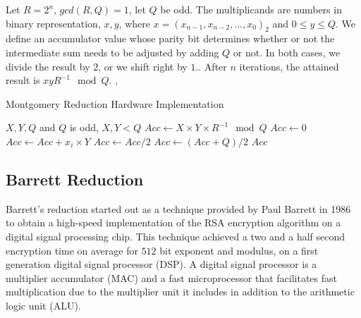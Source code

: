 \documentclass[11pt,
  titlepage=false,
  abstract=on,
]{scrreprt}
\begin{document}
Let $R=2^n$, $gcd(R, Q)=1$, let $Q$ be odd. The multiplicands are numbers in binary representation, $x, y$, where $x = (x_{n-1}, x_{n-2},...,x_{0})_2$ and $0 \leq y \leq Q$. 
We define an accumulator value whose parity bit determines whether or not the intermediate sum needs to be adjusted by adding $Q$ or not. In both cases, we divide the result by
$2$, or we shift right by $1.$. After $n$ iterations, the attained result is $xyR^{-1} \mod Q$. \cite{montgomery1985modular}, \cite{7219961}

\begin{algorithm}
  \caption{Montgomery Reduction Hardware Implementation}
  \label{alg:montgomery}
  \begin{algorithmic}[1]
  \REQUIRE \( X, Y, Q \) and \( Q \) is odd, \( X, Y < Q \)
  \renewcommand{\algorithmicensure}{\textbf{Output:}}
  \ENSURE \( Acc \leftarrow X \times Y \times R^{-1} \mod Q \)
  \STATE \( Acc \leftarrow 0 \)
      \STATE \( Acc \leftarrow Acc + x_i \times Y \)
          \STATE \( Acc \leftarrow Acc / 2 \)
      \ELSE
          \STATE \( Acc \leftarrow (Acc + Q) / 2 \)
      \ENDIF
  \ENDFOR
  \RETURN \( Acc \)
  \end{algorithmic}
\end{algorithm}



\newpage
\subsection{Barrett Reduction}
Barrett's reduction \cite{barrett1986implementing} started out as a technique provided by Paul Barrett in 1986 to obtain a high-speed implementation of the RSA encryption algorithm
on a digital signal processing chip. This technique achieved a two and a half second encryption time on average for $512$ bit exponent and modulus, on a first generation digital signal processor (DSP).
A digital signal processor is a multiplier accumulator (MAC) and a fast microprocessor that facilitates fast multiplication due to the multiplier unit it includes in addition to the arithmetic logic unit (ALU).
\end{document}

